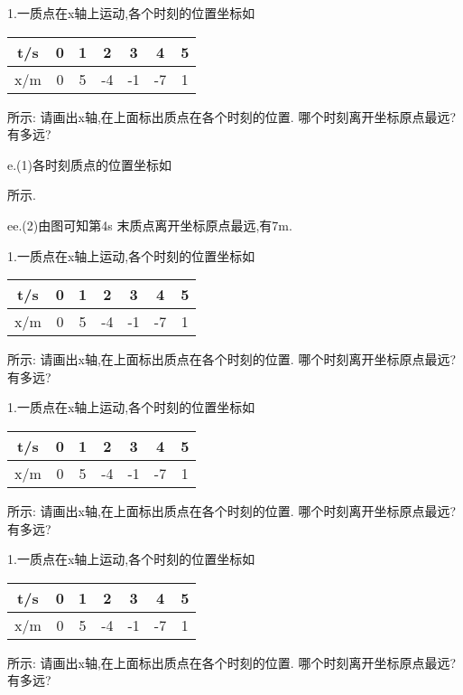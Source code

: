 \documentclass[a4paper,fontset = windowsnew]{ctexbook}
\begin{document}
\begin{jisuan}
   1.一质点在x轴上运动,各个时刻的位置坐标如
   \begin{tabular}{|*{7}{c|}}
      \hline
      t/s & 0 & 1 & 2 & 3 & 4 & 5\\
      \hline
      x/m & 0 & 5 & -4 & -1 & -7 & 1\\
      \hline
   \end{tabular}
   所示:
   \qitem 请画出x轴,在上面标出质点在各个时刻的位置.
   \qitem 哪个时刻离开坐标原点最远?有多远?

%
   e.(1)各时刻质点的位置坐标如
   所示.

   ee.(2)由图可知第4s 末质点离开坐标原点最远,有7m.

  1.一质点在x轴上运动,各个时刻的位置坐标如
   \begin{tabular}{|*{7}{c|}}
      \hline
      t/s & 0 & 1 & 2 & 3 & 4 & 5\\
      \hline
      x/m & 0 & 5 & -4 & -1 & -7 & 1\\
      \hline
   \end{tabular}
   所示:
   \qitem 请画出x轴,在上面标出质点在各个时刻的位置.
   \qitem 哪个时刻离开坐标原点最远?有多远?

  1.一质点在x轴上运动,各个时刻的位置坐标如
   \begin{tabular}{|*{7}{c|}}
      \hline
      t/s & 0 & 1 & 2 & 3 & 4 & 5\\
      \hline
      x/m & 0 & 5 & -4 & -1 & -7 & 1\\
      \hline
   \end{tabular}
   所示:
   \qitem 请画出x轴,在上面标出质点在各个时刻的位置.
   \qitem 哪个时刻离开坐标原点最远?有多远?

  1.一质点在x轴上运动,各个时刻的位置坐标如
   \begin{tabular}{|*{7}{c|}}
      \hline
      t/s & 0 & 1 & 2 & 3 & 4 & 5\\
      \hline
      x/m & 0 & 5 & -4 & -1 & -7 & 1\\
      \hline
   \end{tabular}
   所示:
   \qitem 请画出x轴,在上面标出质点在各个时刻的位置.
   \qitem 哪个时刻离开坐标原点最远?有多远?


\end{jisuan}
\end{document}
